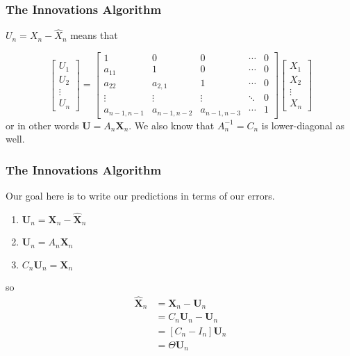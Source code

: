 \documentclass{beamer}
\begin{document}
\begin{frame}
\frametitle{The Innovations Algorithm}
$U_n = X_n - \hat{X}_n$ means that

\[
\left[ \begin{array}{c}
U_1 \\
U_2 \\
\vdots \\
U_n
\end{array}\right]
=
\left[ \begin{array}{ccccc}
1 & 0 & 0 & \cdots & 0 \\
a_{11} & 1 & 0 & \cdots & 0 \\
a_{22} & a_{2,1} & 1 & \cdots & 0 \\
\vdots & \vdots & \vdots & \ddots & 0 \\
a_{n-1,n-1} & a_{n-1,n-2} & a_{n-1,n-3} & \cdots & 1
\end{array}\right]
\left[\begin{array}{c}
X_1 \\
X_2 \\
\vdots \\
X_n
\end{array}\right]
\]
or in other words $\mathbf{U} = A_n \mathbf{X}_n$. We also know that $A_n^{-1} = C_n$ is lower-diagonal as well.

\end{frame}


\begin{frame}
\frametitle{The Innovations Algorithm}

Our goal here is to write our predictions in terms of our errors.
\begin{enumerate}
\item $\mathbf{U}_n = \mathbf{X}_n - \hat{\mathbf{X}}_n$
\item $\mathbf{U}_n = A_n \mathbf{X}_n$
\item $C_n \mathbf{U}_n = \mathbf{X}_n$
\end{enumerate}
so
\begin{align*}
\hat{\mathbf{X}}_n &= \mathbf{X}_n - \mathbf{U}_n \\
&= C_n \mathbf{U}_n - \mathbf{U}_n \\
&= [C_n - I_n]\mathbf{U}_n \\
&= \Theta \mathbf{U}_n
\end{align*}

\end{frame}
\end{document}
